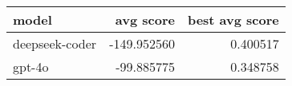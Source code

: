 \begin{tabular}{lrr}
\toprule
model & avg score & best avg score \\
\midrule
deepseek-coder & -149.952560 & 0.400517 \\
gpt-4o & -99.885775 & 0.348758 \\
\bottomrule
\end{tabular}